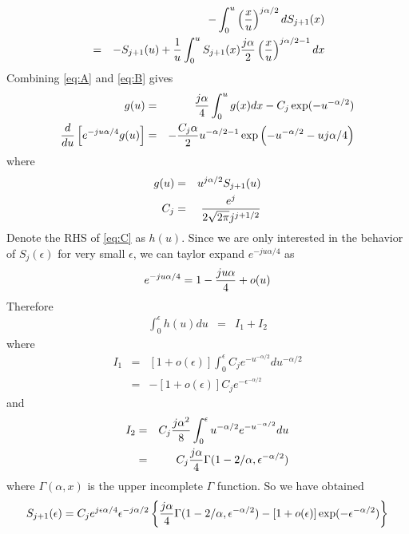 \documentclass[11pt,reqno]{amsart}
\newcommand{\1}{\mathds{1}}
\newcommand{\0}{\boldsymbol{0}}
\newcommand{\4}{\mathchoice{\mskip1.5mu}{\mskip1.5mu}{}{}}
\newcommand{\5}{\mathchoice{\mskip-1.5mu}{\mskip-1.5mu}{}{}}
\newcommand{\2}{\penalty250\mskip\thickmuskip\mskip-\thinmuskip} %
\begin{document}
\begin{eqnarray}
   &&-\int_{0}^u\left({x \over u}\right)^{j\alpha/2} dS_{j+1}(x)
    \nonumber \\
    &=& -S_{j+1}(u) + {1 \over u} \int_{0}^u S_{j+1}(x) {j\alpha \over
    2} \left({x \over u}\right)^{j\alpha/2-1} dx \label{eq:B}
\end{eqnarray}
Combining \eqref{eq:A} and \eqref{eq:B} gives
\begin{eqnarray}
  g(u) &=& {j\alpha \over 4}\int_0^u g(x) dx - C_j
  \exp(-u^{-\alpha/2}) \nonumber \\
  {d \over du}\left[
    e^{-ju\alpha/4} g(u)
  \right] &=& -{C_j \alpha \over 2}u^{-\alpha/2 - 1}\exp\left(
    -u^{-\alpha/2} - uj\alpha/4
  \right) \label{eq:C}
\end{eqnarray}
where
\begin{eqnarray*}
  g(u) &=& u^{j\alpha/2} S_{j+1}(u) \\
  C_j &=& {e^j \over 2\sqrt{2\pi}j^{j + 1/2}}
\end{eqnarray*}
Denote the RHS of \eqref{eq:C} as $h(u)$. Since we are only interested
in the behavior of $S_{j}(\epsilon)$ for very small $\epsilon$, we can
taylor expand $e^{-ju\alpha/4}$ as
\[
e^{-ju\alpha/4} = 1 - {ju\alpha \over 4} + o(u)
\]
Therefore
\begin{eqnarray*}
  \int_0^\epsilon h(u) du &=& I_1 + I_2
\end{eqnarray*}
where
\begin{eqnarray*}
  I_1 &=& [1 + o(\epsilon)]\int_0^\epsilon C_j e^{-u^{-\alpha/2}}
  du^{-\alpha/2} \\
  &=& -[1 + o(\epsilon)]C_je^{-\epsilon^{-\alpha/2}}
\end{eqnarray*}
and
\begin{eqnarray*}
  I_2 &=& C_j {j\alpha^2 \over 8} \int_0^\epsilon u^{-\alpha/2}
  e^{-u^{-\alpha/2}}du \\
  &=& C_j {j\alpha \over 4} \Gamma(1 - 2/\alpha, \epsilon^{-\alpha/2})
\end{eqnarray*}
where $\Gamma(\alpha, x)$ is the upper incomplete $\Gamma$
function. So we have obtained
\begin{equation}
  \label{eq:result}
  S_{j+1}(\epsilon) = C_j e^{j\epsilon \alpha/4} \epsilon^{-j\alpha/2}
  \left\{
    {j\alpha \over 4}\Gamma(1- 2/\alpha, \epsilon^{-\alpha/2})
    - [1 + o(\epsilon)]\exp(-\epsilon^{-\alpha/2})
  \right\}
\end{equation}
\end{document}
